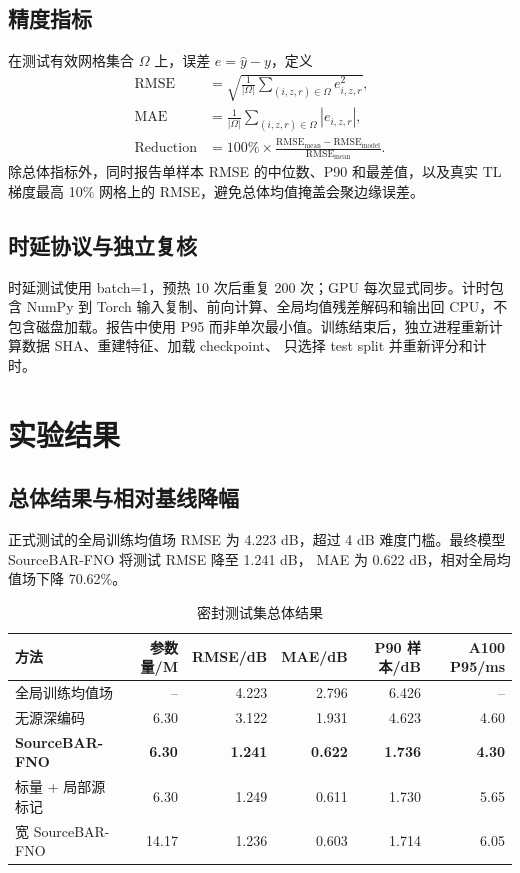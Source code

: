 \documentclass[UTF8,11pt]{ctexart}
\newcommand{\RMSE}{\mathrm{RMSE}}
\newcommand{\BestModel}{SourceBAR-FNO}
\newcommand{\BestRMSE}{1.241}
\newcommand{\BestMAE}{0.622}
\newcommand{\BestPninety}{1.736}
\newcommand{\GlobalBaseline}{4.223}
\newcommand{\RelativeReduction}{70.62}
\newcommand{\GpuPninetyfive}{4.30}
\begin{document}
\subsection{精度指标}

在测试有效网格集合 $\Omega$ 上，误差 $e=\hat y-y$，定义
\begin{align}
  \RMSE &= \sqrt{\frac{1}{|\Omega|}\sum_{(i,z,r)\in\Omega}e_{i,z,r}^2},\\
  \mathrm{MAE} &= \frac{1}{|\Omega|}\sum_{(i,z,r)\in\Omega}|e_{i,z,r}|,\\
  \mathrm{Reduction} &=100\%\times\frac{\RMSE_{\mathrm{mean}}-\RMSE_{\mathrm{model}}}
  {\RMSE_{\mathrm{mean}}}.
\end{align}
除总体指标外，同时报告单样本 RMSE 的中位数、P90 和最差值，以及真实 TL 梯度最高
10\% 网格上的 RMSE，避免总体均值掩盖会聚边缘误差。

\subsection{时延协议与独立复核}

时延测试使用 batch=1，预热 10 次后重复 200 次；GPU 每次显式同步。计时包含 NumPy 到
Torch 输入复制、前向计算、全局均值残差解码和输出回 CPU，不包含磁盘加载。报告中使用 P95
而非单次最小值。训练结束后，独立进程重新计算数据 SHA、重建特征、加载 checkpoint、
只选择 test split 并重新评分和计时。

\section{实验结果}

\subsection{总体结果与相对基线降幅}

正式测试的全局训练均值场 RMSE 为 \GlobalBaseline{} dB，超过 4 dB 难度门槛。最终模型
\BestModel{} 将测试 RMSE 降至 \BestRMSE{} dB，
MAE 为 \BestMAE{} dB，相对全局均值场下降 \RelativeReduction{}\%。

\begin{table}[H]
\centering
\caption{密封测试集总体结果}
\label{tab:results}
\begin{tabular}{lrrrrr}
\toprule
方法 & 参数量/M & RMSE/dB & MAE/dB & P90 样本/dB & A100 P95/ms \\
\midrule
全局训练均值场 & -- & \GlobalBaseline & 2.796 & 6.426 & -- \\
无源深编码 & 6.30 & 3.122 & 1.931 & 4.623 & 4.60 \\
\textbf{SourceBAR-FNO} & \textbf{6.30} & \textbf{\BestRMSE} & \textbf{\BestMAE} &
  \textbf{\BestPninety} & \textbf{\GpuPninetyfive} \\
标量 + 局部源标记 & 6.30 & 1.249 & 0.611 & 1.730 & 5.65 \\
宽 SourceBAR-FNO & 14.17 & 1.236 & 0.603 & 1.714 & 6.05 \\
\bottomrule
\end{tabular}
\end{table}
\end{document}
